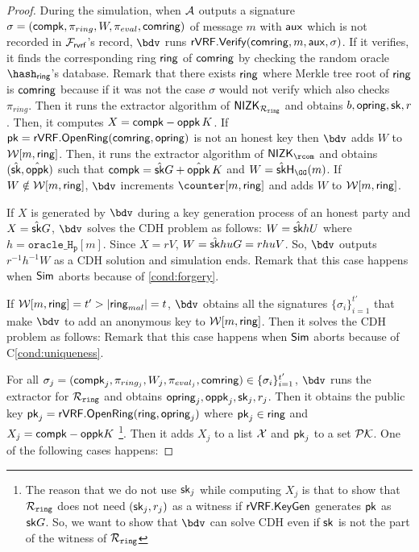 \begin{proof}
	
	During the simulation, when $ \mathcal{A} $ outputs a signature $ \sigma = (\mathsf{compk},\pi_{ring},W,\pi_{eval},\mathsf{comring}) $ of message $ m $ with $ \mathsf{aux} $ which is not recorded in $ \mathcal{F}_{\textsf{rvrf}} $'s record, $ \bdv $ runs $ {\mathsf{rVRF}}.{\mathsf{Verify}}(\mathsf{comring},m, \mathsf{aux}, \sigma) $. If it verifies, it finds the corresponding ring $ \mathsf{ring} $ of $ \mathsf{comring} $ by checking the random oracle $ \hash_\ring $'s database. Remark that there exists $ \mathsf{ring} $ where Merkle tree root of $ \mathsf{ring} $ is $ \mathsf{comring} $ because if it was not the case $ \sigma $ would not verify which also checks  $ \pi_{ring} $. 
	Then it runs the extractor algorithm of $ {\mathsf{NIZK}}_{\mathcal{R}_{\mathtt{ring}}} $ and obtains $ b, \mathsf{opring}, \mathsf{sk},r $. Then, it computes $ X = \mathsf{compk} - \mathsf{oppk} \, K $.
	If $ \mathsf{pk} = {\mathsf{rVRF}}.{\mathsf{OpenRing}}(\mathsf{comring},\mathsf{opring}) $ is not an honest key then $\bdv $ adds $ W $  to $ \mathcal{W}[m, \mathsf{ring}] $.  
	Then, it  runs the extractor algorithm of $ \NIZK_{\rcom} $ and obtains $(\hat{\mathsf{sk}},\hat{\mathsf{oppk}} )$ such that $ \mathsf{compk} = \hat{\mathsf{sk}}G + \hat{\mathsf{oppk}} \, K $ and $ W = \hat{\sk} \hashG(m) $. If  $ W \notin \mathcal{W}[m, \mathsf{ring}] $, $ \bdv $ increments  $ \counter[m,\ring] $ and adds $ W $ to $ \mathcal{W}[m,\mathsf{ring}] $.
	
	If $ X  $ is generated by $ \bdv $ during a key generation process of an honest party and $ X = \hat{\mathsf{sk}}G $, $ \bdv $ solves the CDH problem as follows: $ W = \hat{\mathsf{sk}} h U $ where $ h = \mathtt{oracle\_H_p}[m] $. Since $ X = r V $, $ W = \hat{\mathsf{sk}}huG =rhuV $. So, $ \bdv $ outputs $ r^{-1}h^{-1}W $ as a CDH solution and simulation ends. Remark that this case happens when $ \mathsf{Sim} $ aborts because of \ref{cond:forgery}.
	
	If $ \mathcal{W}[m,\mathsf{ring}] =t' > |\mathsf{ring}_{mal}| =t$, $ \bdv $ obtains all the signatures $ \{\sigma_i\}_{i =1}^{t'} $ that make $ \bdv $ to add an anonymous key to $ \mathcal{W}[m,\mathsf{ring}] $. Then it solves the CDH problem as follows: Remark that this case happens when $ \mathsf{Sim} $ aborts because of C\ref{cond:uniqueness}.
	
	For all $ \sigma_j =(\mathsf{compk}_j,\pi_{ring_j},W_j,\pi_{eval_j},\mathsf{comring}) \in \{\sigma_i\}_{i =1}^{t'} $, $ \bdv $ runs the extractor for $ \mathcal{R}_{\mathtt{ring}} $ and obtains $\mathsf{opring}_j, \mathsf{oppk}_j, \mathsf{sk}_j, r_j$. Then it obtains the public key $ \mathsf{pk}_j = {\mathsf{rVRF}}.{\mathsf{OpenRing}}(\mathsf{ring}, \mathsf{opring}_j) $ where $ \mathsf{pk}_j \in \mathsf{ring} $ and  $ X_j = \mathsf{compk}- \mathsf{oppk} K $ \footnote{The reason that we do not use $ \mathsf{sk}_j $ while computing $ X_j $ is that to show that $ \mathcal{R}_{\mathtt{ring}} $ does not need $ (\mathsf{sk}_j,r_j) $ as a witness if $ {\mathsf{rVRF}}.{\mathsf{KeyGen}} $ generates $ \mathsf{pk}  $ as $ \mathsf{sk}G $. So, we want to show that $ \bdv $ can solve CDH even if $ \mathsf{sk} $ is not the part of the witness of $ \mathcal{R}_{\mathtt{ring}} $}. Then it adds $ X_j $ to a list $ {\mathcal{X}}  $ and $ \mathsf{pk}_j $ to a set $ {\mathcal{PK}} $. One of the following cases happens:
	

\end{proof}
